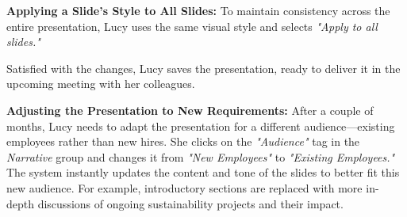 \textbf{Applying a Slide's Style to All Slides:}
To maintain consistency across the entire presentation, Lucy uses the same visual style and selects \textit{"Apply to all slides."} 

Satisfied with the changes, Lucy saves the presentation, ready to deliver it in the upcoming meeting with her colleagues.

\textbf{Adjusting the Presentation to New Requirements:}
After a couple of months, Lucy needs to adapt the presentation for a different audience—existing employees rather than new hires. She clicks on the \textit{"Audience"} tag in the \textit{Narrative} group and changes it from \textit{"New Employees"} to \textit{"Existing Employees."} The system instantly updates the content and tone of the slides to better fit this new audience. For example, introductory sections are replaced with more in-depth discussions of ongoing sustainability projects and their impact.


